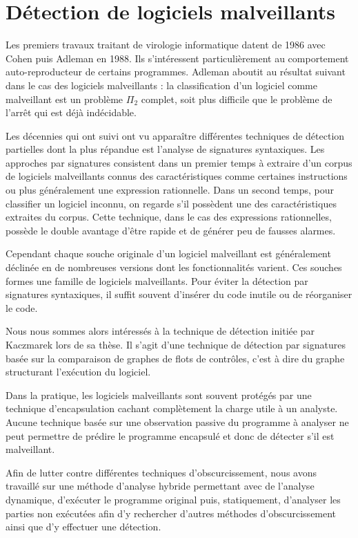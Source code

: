 \section{Détection de logiciels malveillants}
Les premiers travaux traitant de virologie informatique datent de 1986 avec Cohen \cite{Cohen86} puis Adleman \cite{Adleman88} en 1988. Ils s'intéressent particulièrement au comportement auto-reproducteur de certains programmes. Adleman  aboutit au résultat suivant dans le cas des logiciels malveillants : la classification d'un logiciel comme malveillant est un problème $\Pi_2$ complet, soit plus difficile que le problème de l'arrêt qui est déjà indécidable.

Les décennies qui ont suivi ont vu apparaître différentes techniques de détection partielles dont la plus répandue est l'analyse de signatures syntaxiques. Les approches par signatures consistent dans un premier temps à extraire d'un corpus de logiciels malveillants connus des caractéristiques comme certaines instructions ou plus généralement une expression rationnelle. Dans un second temps, pour classifier un logiciel inconnu, on regarde s'il possèdent une des caractéristiques extraites du corpus.
Cette technique, dans le cas des expressions rationnelles, possède le double avantage d'être rapide et de générer peu de fausses alarmes.

Cependant chaque souche originale d'un logiciel malveillant est généralement déclinée en de nombreuses versions dont les fonctionnalités varient. Ces souches formes une famille de logiciels malveillants. Pour éviter la détection par signatures syntaxiques, il suffit souvent d'insérer du code inutile ou de réorganiser le code.

Nous nous sommes alors intéressés à la technique de détection initiée par Kaczmarek \cite{AThierry_BKM08} lors de sa thèse. Il s'agit d'une technique de détection par signatures basée sur la comparaison de graphes de flots de contrôles, c'est à dire du graphe structurant l'exécution du logiciel.

Dans la pratique, les logiciels malveillants sont souvent protégés par une technique d'encapsulation cachant complètement la charge utile à un analyste.
Aucune technique basée sur une observation passive du programme à analyser ne peut permettre de prédire le programme encapsulé et donc de détecter s'il est malveillant.

Afin de lutter contre différentes techniques d'obscurcissement, nous avons travaillé sur une méthode d'analyse hybride permettant avec de l'analyse dynamique, d'exécuter le programme original puis, statiquement, d'analyser les parties non exécutées afin d'y rechercher d'autres méthodes d'obscurcissement ainsi que d'y effectuer une détection.

